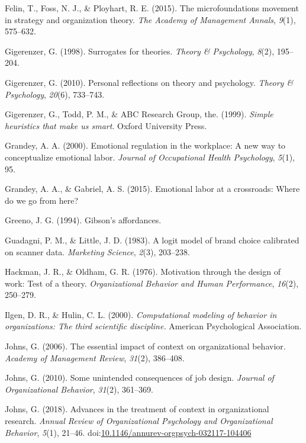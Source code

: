 \documentclass[english,man]{apa6}
\theoremstyle{definition}
\theoremstyle{definition}
\theoremstyle{definition}
\theoremstyle{remark}
\begin{document}
\hypertarget{ref-felin2015}{}
Felin, T., Foss, N. J., \& Ployhart, R. E. (2015). The microfoundations
movement in strategy and organization theory. \emph{The Academy of
Management Annals}, \emph{9}(1), 575--632.

\hypertarget{ref-gigerenzer1998}{}
Gigerenzer, G. (1998). Surrogates for theories. \emph{Theory \&
Psychology}, \emph{8}(2), 195--204.

\hypertarget{ref-gigerenzer2010}{}
Gigerenzer, G. (2010). Personal reflections on theory and psychology.
\emph{Theory \& Psychology}, \emph{20}(6), 733--743.

\hypertarget{ref-gigerenzer1999}{}
Gigerenzer, G., Todd, P. M., \& ABC Research Group, the. (1999).
\emph{Simple heuristics that make us smart}. Oxford University Press.

\hypertarget{ref-grandey2000}{}
Grandey, A. A. (2000). Emotional regulation in the workplace: A new way
to conceptualize emotional labor. \emph{Journal of Occupational Health
Psychology}, \emph{5}(1), 95.

\hypertarget{ref-grandey2015}{}
Grandey, A. A., \& Gabriel, A. S. (2015). Emotional labor at a
crossroads: Where do we go from here?

\hypertarget{ref-greeno1994}{}
Greeno, J. G. (1994). Gibson's affordances.

\hypertarget{ref-guadagni1983}{}
Guadagni, P. M., \& Little, J. D. (1983). A logit model of brand choice
calibrated on scanner data. \emph{Marketing Science}, \emph{2}(3),
203--238.

\hypertarget{ref-hackman1976}{}
Hackman, J. R., \& Oldham, G. R. (1976). Motivation through the design
of work: Test of a theory. \emph{Organizational Behavior and Human
Performance}, \emph{16}(2), 250--279.

\hypertarget{ref-Ilgen2000}{}
Ilgen, D. R., \& Hulin, C. L. (2000). \emph{Computational modeling of
behavior in organizations: The third scientific discipline.} American
Psychological Association.

\hypertarget{ref-johns2006}{}
Johns, G. (2006). The essential impact of context on organizational
behavior. \emph{Academy of Management Review}, \emph{31}(2), 386--408.

\hypertarget{ref-johns2010}{}
Johns, G. (2010). Some unintended consequences of job design.
\emph{Journal of Organizational Behavior}, \emph{31}(2), 361--369.

\hypertarget{ref-johns2017}{}
Johns, G. (2018). Advances in the treatment of context in organizational
research. \emph{Annual Review of Organizational Psychology and
Organizational Behavior}, \emph{5}(1), 21--46.
doi:\href{https://doi.org/10.1146/annurev-orgpsych-032117-104406}{10.1146/annurev-orgpsych-032117-104406}
\end{document}
